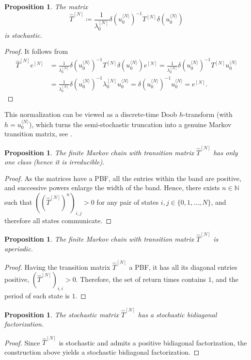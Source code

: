 \documentclass[11pt]{amsart}
\theoremstyle{plain}
\newtheorem{pro}[teo]{Proposition}
\newcommand{\N}{\mathbb{N}}
\newcommand{\1}{\text{\fontseries{bx}\selectfont \textup 1}}
\begin{document}
\begin{pro}
	The matrix
	\[
	\hat T^{[N]}\coloneq \frac{1}{\lambda_0^{[N]}}\delta(u_0^{\langle N\rangle})^{-1} T^{[N]} \delta(u_0^{\langle N\rangle})
	\]
	is stochastic.
\end{pro}
\begin{proof}
	It follows from
	\[
	\begin{aligned}
		\hat T^{[N]} e^{[N]}&=\frac{1}{\lambda_0^{[N]}}\delta(u_0^{\langle N\rangle})^{-1} T^{[N]} \delta(u_0^{\langle N\rangle}) e^{[N]}
		=\frac{1}{\lambda_0^{[N]}}\delta(u_0^{\langle N\rangle})^{-1} T^{[N]} u_0^{\langle N\rangle}
		\\& =\frac{1}{\lambda_0^{[N]}}\delta(u_0^{\langle N\rangle})^{-1} \lambda^{[N]}_0u_0^{\langle N\rangle}
		=\delta(u_0^{\langle N\rangle})^{-1} u_0^{\langle N\rangle}=e^{[N]}.
	\end{aligned}
	\]
\end{proof}

This normalization can be viewed as a discrete-time Doob $h$-transform
(with $h=u_0^{\langle N\rangle}$), which turns the semi-stochastic truncation
into a genuine Markov transition matrix, see \cite{Doob1957,Doob1984,LevinPeresWilmer2017}.

\begin{pro}
	The finite Markov chain with transition matrix $\hat T^{[N]}$ has only one class (hence it is irreducible).
\end{pro}
\begin{proof}
	As the matrices have a PBF, all the entries within the band are positive, and successive powers enlarge the width of the band. Hence, there exists $n\in\N$ such that $((\hat T^{[N]})^{n})_{i,j}>0$ for any pair of states $i,j\in\{0,1,\dots,N\}$, and therefore all states communicate.
\end{proof}

\begin{pro}
	The finite Markov chain with transition matrix $\hat T^{[N]}$ is aperiodic.
\end{pro}
\begin{proof}
	Having the transition matrix $\hat T^{[N]}$ a PBF, it has all its diagonal entries positive, $(\hat T^{[N]})_{i,i}>0$. Therefore, the set of return times contains $1$, and the period of each state is $1$.
\end{proof}


\begin{pro}
	The stochastic matrix $\hat T^{[N]}$ has a stochastic bidiagonal factorization.
\end{pro}
\begin{proof}
	Since $\hat T^{[N]}$ is stochastic and admits a positive bidiagonal factorization, the construction above yields a stochastic bidiagonal factorization.
\end{proof}
\end{document}
